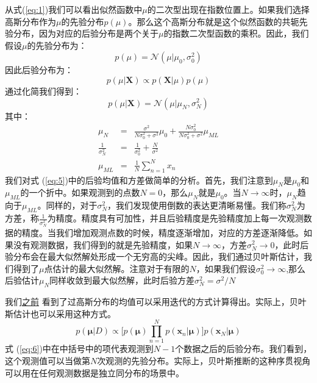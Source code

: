 \documentclass[10pt,a4paper,UTF8]{article}
\begin{document}
从式(\ref{eq:1})我们可以看出似然函数中\(\mu\)的二次型出现在指数位置上。如果我们选择高斯分布作为\(\mu\)的先验分布\(p(\mu)\)。那么这个高斯分布就是这个似然函数的共轭先验分布，因为对应的后验分布是两个关于\(\mu\)的指数二次型函数的乘积。因此，我们假设\(\mu\)的先验分布为：
\begin{equation}
\label{eq:2}
p(\mu) = \mathcal{N}(\mu|\mu_{0},\sigma_{0}^{2})
\end{equation}
因此后验分布为：
\begin{equation}
\label{eq:3}
p(\mu|\mathbf{X}) \propto p(\mathbf{X}|\mu)p(\mu)
\end{equation}
通过化简我们得到：
\begin{equation}
\label{eq:4}
p(\mu|\mathbf{X}) = \mathcal{N}(\mu|\mu_{N},\sigma_{N}^{2})
\end{equation}
其中：
\begin{eqnarray}
\label{eq:5}
\mu_{N}&=& \frac{\sigma^{2}}{N\sigma_{0}^{2} + \sigma^{2}}\mu_{0} + \frac{N\sigma_{0}^{2}}{N\sigma_{0}^{2} +\sigma^{2}}\mu_{ML} \\
\frac{1}{\sigma_{N}^{2}} &=& \frac{1}{\sigma_{0}^{2}} + \frac{N}{\sigma^{2}}\\
\mu_{ML}&=& \frac{1}{N} \sum_{n=1}^{N}x_{n}
\end{eqnarray}
我们对式 (\ref{eq:5})中的后验均值和方差做简单的分析。首先，我们注意到\(\mu_{N}\)是\(\mu_{0}\)和\(\mu_{ML}\)的一个折中。如果观测到的点数\(N=0\)，那么\(\mu_{N}\)就是\(\mu_{0}\)。当\(N\to \infty\)时，\(\mu_{N}\)趋向于\(\mu_{ML}\)。同样的，对于\(\sigma_{N}^{2}\)，我们发现使用倒数的表达更清晰易懂。我们称\(\sigma_{N}^{2}\)为方差，称\(\frac{1}{\sigma_{N}^{2}}\)为精度。精度具有可加性，并且后验精度是先验精度加上每一次观测数据的精度。当我们增加观测点数的时候，精度逐渐增加，对应的方差逐渐降低。如果没有观测数据，我们得到的就是先验精度，如果\(N\to \infty\)，方差\(\sigma_{N}^{2}\to 0\)，此时后验分布会在最大似然解处形成一个无穷高的尖峰。因此，我们通过贝叶斯估计，我们得到了\(\mu\)点估计的最大似然解。注意对于有限的\(N\)，如果我们假设\(\sigma_{0}^{2}\to \infty\),那么后验估计\(\mu_{N}\)同样收敛到最大似然解，此时后验方差\(\sigma_{N}^{2} = \sigma^{2}/N\)

我们\href{PRMLch2dot3-maximum-likelihood-for-gaussian.org}{之前} 看到了过高斯分布的均值可以采用迭代的方式计算得出。实际上，贝叶斯估计也可以采用这种方式。
\begin{equation}
\label{eq:6}
p(\mathbf{\mu}| D) \propto \bigg[ p(\mathbf{\mu}) \prod_{n=1}^{N}p(\mathbf{x}_{n}| \mathbf{\mu}) \bigg] p(\mathbf{x}_{N}|\mathbf{\mu})
\end{equation}
式 (\ref{eq:6})中在中括号中的项代表观测到\(N-1\)个数据之后的后验分布。我们看到，这个观测值可以当做第\(N\)次观测的先验分布。实际上，贝叶斯推断的这种序贯视角可以用在任何观测数据是独立同分布的场景中。
\end{document}
